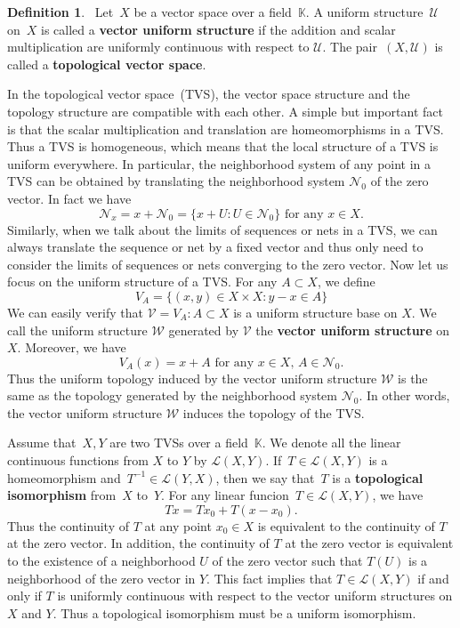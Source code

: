 \documentclass[12pt,a4paper,draft]{article}  %
\theoremstyle{definition}
\newtheorem{definition}{Definition}[section]
\numberwithin{equation}{section}
\begin{document}
\begin{definition}~\label{def3.1}
    Let~$X$ be a vector space over a field~$\mathbb{K}$.
    A uniform structure~$\mathcal{U}$ on~$X$ is called a \textbf{vector uniform structure} if the addition and scalar multiplication are uniformly continuous with respect to $\mathcal{U}$.
    The pair~$(X,\mathcal{U})$ is called a \textbf{topological vector space}.
\end{definition}
In the topological vector space~(TVS), the vector space structure and the topology structure are compatible with each other.
A simple but important fact is that the scalar multiplication and translation are homeomorphisms in a TVS.
Thus a TVS is homogeneous, which means that the local structure of a TVS is uniform everywhere.
In particular, the neighborhood system of any point in a TVS can be obtained by translating the neighborhood system $\mathcal{N}_0$ of the zero vector.
In fact we have 
$$\mathcal{N}_x = x+\mathcal{N}_0 = \{x+U: U \in \mathcal{N}_0\} \text{ for any }x \in X.$$
Similarly, when we talk about the limits of sequences or nets in a TVS, we can always translate the sequence or net by a fixed vector and thus only need to consider the limits of sequences or nets converging to the zero vector.
Now let us focus on the uniform structure of a TVS.
For any $A \subset X$, we define
$$ V_A=\{(x,y) \in X \times X: y-x \in A\} $$
We can easily verify that $\mathcal{V}={V_A:A \subset X}$ is a uniform structure base on $X$.
We call the uniform structure $\mathcal{W}$ generated by $\mathcal{V}$ the \textbf{vector uniform structure} on $X$.
Moreover, we have 
$$ V_A(x)=x+A \text{ for any }x \in X \text{, } A \in \mathcal{N}_0. $$
Thus the uniform topology induced by the vector uniform structure $\mathcal{W}$ is the same as the topology generated by the neighborhood system $\mathcal{N}_0$.
In other words, the vector uniform structure $\mathcal{W}$ induces the topology of the TVS.

Assume that~$X,Y$ are two TVSs over a field~$\mathbb{K}$. We denote all the linear continuous functions from $X$ to $Y$ by $\mathcal{L}(X,Y)$.
If~$T \in \mathcal{L}(X,Y)$ is a homeomorphism and~$T^{-1} \in \mathcal{L}(Y,X)$, then we say that~$T$ is a \textbf{topological isomorphism} from~$X$ to~$Y$.
For any linear funcion~$T \in \mathcal{L}(X,Y)$, we have
$$ Tx=Tx_0 + T(x-x_0). $$
Thus the continuity of $T$ at any point $x_0 \in X$ is equivalent to the continuity of $T$ at the zero vector.
In addition, the continuity of $T$ at the zero vector is equivalent to the existence of a neighborhood $U$ of the zero vector such that $T(U)$ is a neighborhood of the zero vector in $Y$.
This fact implies that $T \in \mathcal{L}(X,Y)$ if and only if $T$ is uniformly continuous with respect to the vector uniform structures on $X$ and $Y$.
Thus a topological isomorphism must be a uniform isomorphism.
\end{document}

